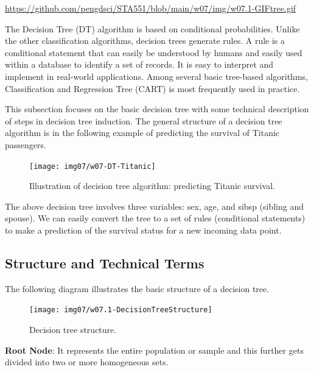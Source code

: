 \documentclass[
]{book}
\begin{document}
\url{https://github.com/pengdsci/STA551/blob/main/w07/img/w07.1-GIFtree.gif}

The Decision Tree (DT) algorithm is based on conditional probabilities. Unlike the other classification algorithms, decision trees generate rules. A rule is a conditional statement that can easily be understood by humans and easily used within a database to identify a set of records. It is easy to interpret and implement in real-world applications. Among several basic tree-based algorithms, Classification and Regression Tree (CART) is most frequently used in practice.

This subsection focuses on the basic decision tree with some technical description of steps in decision tree induction. The general structure of a decision tree algorithm is in the following example of predicting the survival of Titanic passengers.

\begin{figure}

{\centering \texttt{[image: img07/w07-DT-Titanic]} 

}

\caption{Illustration of decision tree algorithm: predicting Titanic survival.}\label{fig:unnamed-chunk-168}
\end{figure}

The above decision tree involves three variables: sex, age, and sibsp (sibling and spouse). We can easily convert the tree to a set of rules (conditional statements) to make a prediction of the survival status for a new incoming data point.

\hypertarget{structure-and-technical-terms}{%
\subsection{Structure and Technical Terms}\label{structure-and-technical-terms}}

The following diagram illustrates the basic structure of a decision tree.

\begin{figure}

{\centering \texttt{[image: img07/w07.1-DecisionTreeStructure]} 

}

\caption{Decision tree structure.}\label{fig:unnamed-chunk-169}
\end{figure}

\textbf{Root Node}: It represents the entire population or sample and this further gets divided into two or more homogeneous sets.
\end{document}
